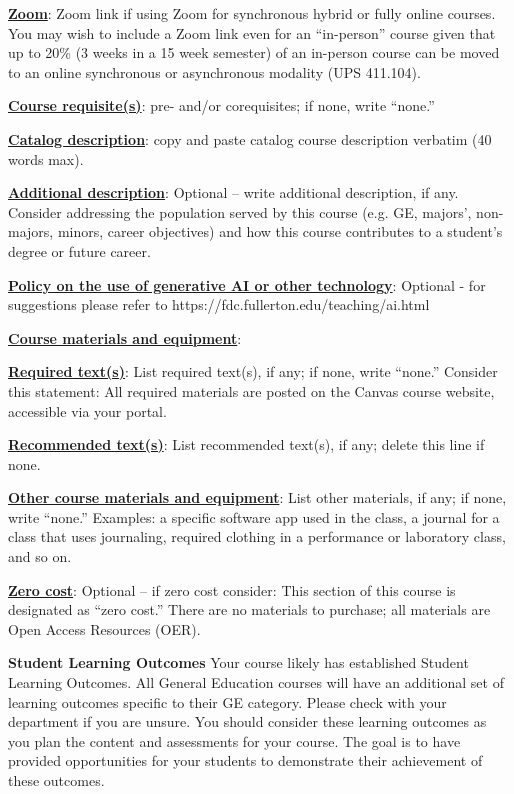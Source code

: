 \documentclass[12pt]{article}
\begin{document}
\textbf{\uline{Zoom}}: Zoom link if using Zoom for synchronous hybrid or fully online courses. {\color{annotationblue}You may wish to include a Zoom link even for an ``in-person'' course given that up to 20\% (3 weeks in a 15 week semester) of an in-person course can be moved to an online synchronous or asynchronous modality (UPS 411.104).}

\textbf{\uline{Course requisite(s)}}: pre- and/or corequisites; if none, write ``none.''

\textbf{\uline{Catalog description}}: copy and paste catalog course description verbatim (40 words max).

\textbf{\uline{Additional description}}: {\color{annotationblue}Optional -- write additional description, if any. Consider addressing the population served by this course (e.g. GE, majors', non-majors, minors, career objectives) and how this course contributes to a student's degree or future career.}

\textbf{\uline{Policy on the use of generative AI or other technology}}: {\color{annotationblue}Optional - for suggestions please refer to https://fdc.fullerton.edu/teaching/ai.html}

\textbf{\uline{Course materials and equipment}}:

\textbf{\uline{Required text(s)}}: List required text(s), if any; if none, write ``none.'' {\color{suggestionred}Consider this statement: All required materials are posted on the Canvas course website, accessible via your portal.}

\textbf{\uline{Recommended text(s)}}: {\color{annotationblue}List recommended text(s), if any; delete this line if none.}

\textbf{\uline{Other course materials and equipment}}: List other materials, if any; if none, write ``none.'' {\color{annotationblue}Examples: a specific software app used in the class, a journal for a class that uses journaling, required clothing in a performance or laboratory class, and so on.}

\textbf{\uline{Zero cost}}: {\color{annotationblue}Optional -- if zero cost consider:} {\color{suggestionred}This section of this course is designated as ``zero cost.'' There are no materials to purchase; all materials are Open Access Resources (OER).}

\textbf{Student Learning Outcomes} {\color{annotationblue}Your course likely has established Student Learning Outcomes. All General Education courses will have an additional set of learning outcomes specific to their GE category. Please check with your department if you are unsure. You should consider these learning outcomes as you plan the content and assessments for your course. The goal is to have provided opportunities for your students to demonstrate their achievement of these outcomes.}
\end{document}
